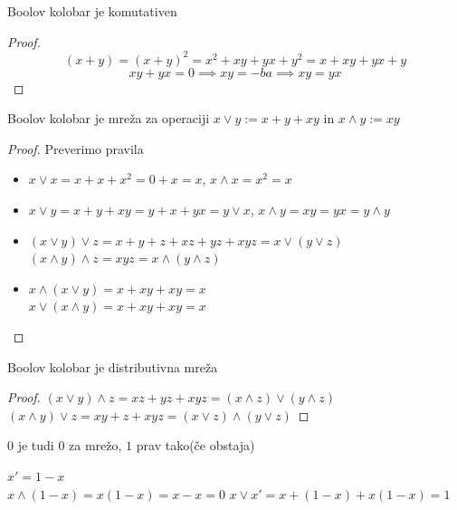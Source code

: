 \documentclass{beamer}
\begin{document}
\begin{frame}


\begin{theorem}
Boolov kolobar je komutativen
\end{theorem}
\pause
\begin{proof}
$$(x + y) = (x+y)^2 = x^2 + xy + yx + y^2 = x + xy + yx + y$$ 
$$xy + yx = 0 \implies xy = -ba \implies xy = yx $$
\end{proof}
\end{frame}

\begin{frame}
\begin{theorem}
Boolov kolobar je mreža za operaciji $x \lor y := x + y + xy$ in $x \land y := xy$
\end{theorem}
\end{frame}

\begin{frame}
\begin{proof}
Preverimo pravila
\begin{itemize}
\item $x \lor x = x + x + x^2 = 0 + x = x$, $x \land x = x^2 = x$
\item $x \lor y = x + y + xy = y + x + yx = y \lor x$, $x \land y = xy = yx = y \land y$\pause
\item $(x \lor y) \lor z  = x + y + z + xz + yz +xyz = x \lor (y \lor z)$\pause
$(x \land y) \land z = xyz = x \land (y \land z)$ 
\item $x \land (x \lor y) = x + xy + xy = x$\\ \pause
$x \lor (x \land y) = x + xy + xy = x$
\end{itemize}
\end{proof}
\end{frame}

\begin{frame}
\begin{theorem}
Boolov kolobar je distributivna mreža
\end{theorem}
\begin{proof}
$(x \lor y) \land z = xz + yz + xyz = (x \land z) \lor (y \land z)$ \\
$(x \land y) \lor z = xy + z + xyz = (x \lor z) \land (y \lor z)$
\end{proof}
\end{frame}

\begin{frame}
\begin{block}{}
$0$ je tudi $0$ za mrežo, $1$ prav tako(če obstaja)
\end{block}

\begin{block}{}
$x' = 1-x $ \\ \pause
$x \land (1-x) = x(1-x) = x - x = 0 $
$x \lor x'= x + (1-x) + x(1-x) = 1 $
\end{block}


\end{frame}
\end{document}
